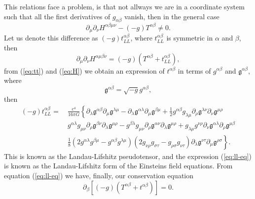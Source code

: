 This relations face a problem, is that not allways we are in a coordinate
system such that all the first derivatives of $g_{\alpha\beta}$ vanish,
then in the general case 
\[
\partial_{\mu}\partial_{\nu}H^{\alpha\beta\mu\nu}-\left(-g\right)T^{\alpha\beta}\neq0.
\]
Let us denote this difference as $\left(-g\right)t_{LL}^{\alpha\beta}$,
where $t_{LL}^{\alpha\beta}$ is symmetric in $\alpha$ and $\beta$,
then
\begin{equation}
\partial_{\mu}\partial_{\nu}H^{\alpha\mu\beta\nu}=\left(-g\right)\left(T^{\alpha\beta}+t_{LL}^{\alpha\beta}\right),\label{eq:ll-eq}
\end{equation}
from (\ref{eq:tt}) and (\ref{eq:H}) we obtain an expression of $t^{\alpha\beta}$
in terms of $g^{\alpha\beta}$ and $\mathfrak{g}^{\alpha\beta}$,
where 
\begin{equation}
\mathfrak{g}^{\alpha\beta}=\sqrt{-g}g^{\alpha\beta},\label{eq:goth-g}
\end{equation}
 then
\begin{align*}
\left(-g\right)t_{LL}^{\alpha\beta}= & \ \frac{c^{4}}{16\pi G}\left\{ \partial_{\lambda}\mathfrak{g}^{\alpha\beta}\partial_{\mu}\mathfrak{g}^{\lambda\mu}-\partial_{\lambda}\mathfrak{g}^{\alpha\lambda}\partial_{\mu}\mathfrak{g}^{\beta\mu}+\frac{1}{2}g^{\alpha\beta}g_{\lambda\mu}\partial_{\rho}\mathfrak{g}^{\lambda\nu}\partial_{\nu}\mathfrak{g}^{\mu\rho}\right.\\
\  & \ g^{\alpha\lambda}g_{\mu\nu}\partial_{\rho}\mathfrak{g}^{\beta\nu}\partial_{\lambda}\mathfrak{g}^{\mu\rho}-g^{\beta\lambda}g_{\mu\nu}\partial_{\rho}\mathfrak{g}^{\alpha\nu}\partial_{\lambda}\mathfrak{g}^{\mu\rho}+g_{\lambda\mu}g^{\nu\rho}\partial_{\nu}\mathfrak{g}^{\alpha\lambda}\partial_{\rho}\mathfrak{g}^{\mu\beta}\\
\  & \ \left.\frac{1}{8}\left(2g^{\alpha\lambda}g^{\beta\mu}-g^{\alpha\beta}g^{\lambda\mu}\right)\left(2g_{\nu\rho}g_{\sigma\tau}-g_{\rho\sigma}g_{\nu\tau}\right)\partial_{\lambda}\mathfrak{g}^{\nu\tau}\partial_{\mu}\mathfrak{g}^{\rho\sigma}\right\} .
\end{align*}
This is known as the Landau-Lifshitz pseudotensor, and the expression
(\ref{eq:ll-eq}) is known as the Landau-Lifshitz form of the Einsteins
field equations. From equation (\ref{eq:ll-eq}) we have, finally,
our conservation equation
\begin{equation}
\partial_{\beta}\left[\left(-g\right)\left(T^{\alpha\beta}+t^{\alpha\beta}\right)\right]=0.\label{eq:gen-con-law}
\end{equation}

